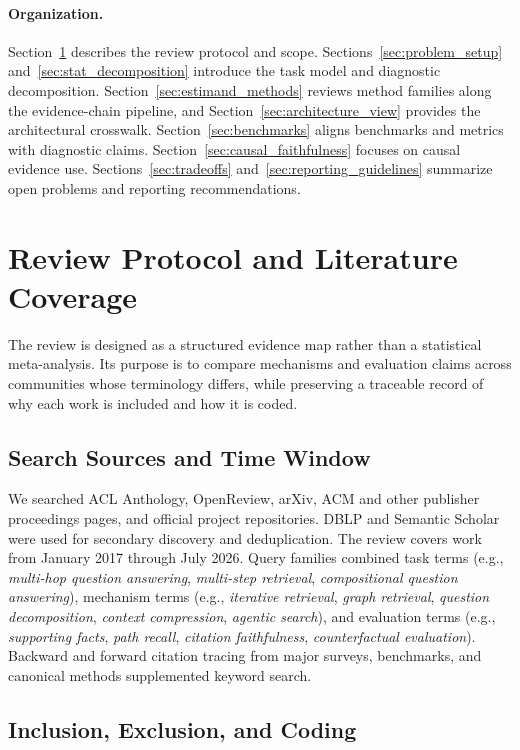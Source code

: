 \documentclass[manuscript,review]{acmart}
\theoremstyle{definition}
\theoremstyle{plain}
\theoremstyle{remark}
\begin{document}
\paragraph{Organization.}
Section~\ref{sec:survey_methodology} describes the review protocol and scope.
Sections~\ref{sec:problem_setup} and~\ref{sec:stat_decomposition} introduce
the task model and diagnostic decomposition. Section~\ref{sec:estimand_methods}
reviews method families along the evidence-chain pipeline, and
Section~\ref{sec:architecture_view} provides the architectural crosswalk.
Section~\ref{sec:benchmarks} aligns benchmarks and metrics with diagnostic
claims. Section~\ref{sec:causal_faithfulness} focuses on causal evidence use.
Sections~\ref{sec:tradeoffs} and~\ref{sec:reporting_guidelines} summarize open
problems and reporting recommendations.
\section{Review Protocol and Literature Coverage}
\label{sec:survey_methodology}

The review is designed as a structured evidence map rather than a statistical
meta-analysis. Its purpose is to compare mechanisms and evaluation claims
across communities whose terminology differs, while preserving a traceable
record of why each work is included and how it is coded.

\subsection{Search Sources and Time Window}
\label{subsec:search_protocol}

We searched ACL Anthology, OpenReview, arXiv, ACM and other publisher
proceedings pages, and official project repositories. DBLP and Semantic
Scholar were used for secondary discovery and deduplication. The review
covers work from January 2017 through July 2026. Query families combined task
terms (e.g., \emph{multi-hop question answering}, \emph{multi-step
retrieval}, \emph{compositional question answering}), mechanism terms
(e.g., \emph{iterative retrieval}, \emph{graph retrieval}, \emph{question
decomposition}, \emph{context compression}, \emph{agentic search}), and
evaluation terms (e.g., \emph{supporting facts}, \emph{path recall},
\emph{citation faithfulness}, \emph{counterfactual evaluation}). Backward
and forward citation tracing from major surveys, benchmarks, and canonical
methods supplemented keyword search.

\subsection{Inclusion, Exclusion, and Coding}
\end{document}
